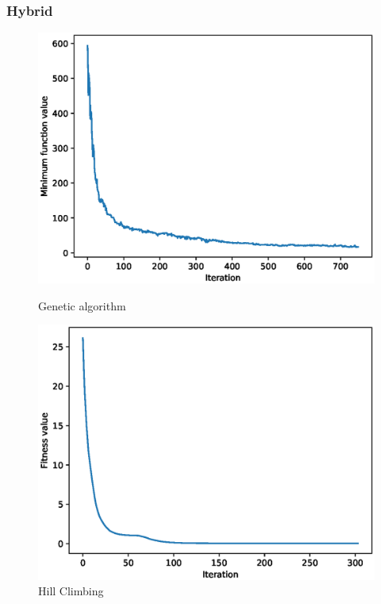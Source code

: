 \documentclass{article}
\begin{document}
\subsubsection{Hybrid}
\begin{figure}[!htbp]
	\centering
	\begin{minipage}{.48\textwidth}
		\centering
		\includegraphics[scale=.4]{experiment_3a_griewangk/ga_min_eval_0.eps}
		\caption{Genetic algorithm}
	\end{minipage}\hfill
	\begin{minipage}{.48\textwidth}
		\centering
		\includegraphics[scale=.4]{experiment_3a_griewangk/hc_max_fitness_0.eps}
		\caption{Hill Climbing}
	\end{minipage}\hfill
\end{figure}
\FloatBarrier
\end{document}
